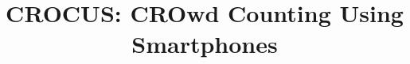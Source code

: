 \documentclass[conference]{IEEEtran}
\begin{document}
\title{%
  CROCUS: CROwd Counting Using Smartphones 
}



\end{document}
